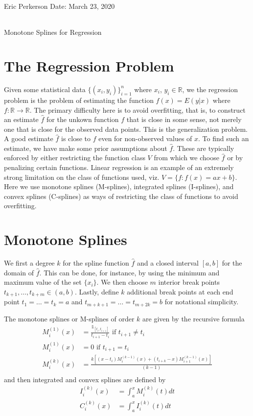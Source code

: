 \documentclass{article}
\newcommand{\header}[5]{
    \begin{center}
    {
        \small  #1 #2
        \hfill { {Date: #5} }\\ \vspace{.5pt}
        #3 \hfill
        {
             
        }
    }
    \vspace{-1ex}
    \hrulefill\\
    \vspace{4ex}
    {
        \LARGE Monotone Splines for Regression
    } \\
    \vspace{20pt}
    \end{center}
}
\begin{document}

\header{}{Eric Perkerson}{}{1}{March 23, 2020}
\begin{center}
{ \large }
\end{center}

\section{The Regression Problem}

Given some statistical data $\{ (x_i, y_i) \}_{i = 1}^n$ where $x_i$, $y_i \in \mathbb{R}$, we the regression problem is the problem of estimating the function $f(x) = E(y | x)$ where $f \colon \mathbb{R} \to \mathbb{R}$. The primary difficulty here is to avoid overfitting, that is, to construct an estimate $\widehat{f}$ for the unkown function $f$ that is close in some sense, not merely one that is close for the observed data points. This is the generalization problem. A good estimate $\widehat{f}$ is close to $f$ even for non-observed values of $x$. To find such an estimate, we have make some prior assumptions about $\hat{f}$. These are typically enforced by either restricting the function class $V$ from which we choose $\widehat{f}$ or by penalizing certain functions. Linear regression is an example of an extremely strong limitation on the class of functions used, viz. $V = \{ f \colon f(x) = ax + b\}$. Here we use monotone splines (M-splines), integrated splines (I-splines), and convex splines (C-splines) as ways of restricting the class of functions to avoid overfitting.

\section{Monotone Splines}

We first a degree $k$ for the spline function $\widehat{f}$ and a closed interval $[a, b]$ for the domain of $\widehat{f}$. This can be done, for instance, by using the minimum and maximum value of the set $\{ x_i \}$. We then choose $m$ interior break points $t_{k + 1}, \dots, t_{k + m} \in (a, b)$. Lastly, define $k$ additional break points at each end point $t_1 = \dots = t_k = a$ and $t_{m + k + 1} = \dots = t_{m + 2k} = b$ for notational simplicity.

The monotone splines or M-splines of order $k$ are given by the recursive formula
\begin{align*}
    M^{(1)}_i (x) & = \frac{\mathds{1}_{[t_i, t_{i+1}]}}{t_{i+1} - t_i} \text{ if $t_{i+1} \ne t_i$ } \\
    M^{(1)}_i (x) & = 0 \text{ if $t_{i+1} = t_i$ } \\
    M^{(k)}_i (x) & = \frac{k[(x - t_i)M^{(k - 1)}_i (x) + (t_{i + k} - x)M^{(k - 1)}_{i+1} (x)]}{(k-1)} \\
\end{align*}
and then integrated and convex splines are defined by
\begin{align*}
    I^{(k)}_i (x) & = \int_a^x M^{(k)}_i (t) dt \\
    C^{(k)}_i (x) & = \int_a^x I^{(k)}_i (t) dt
\end{align*}
\end{document}
